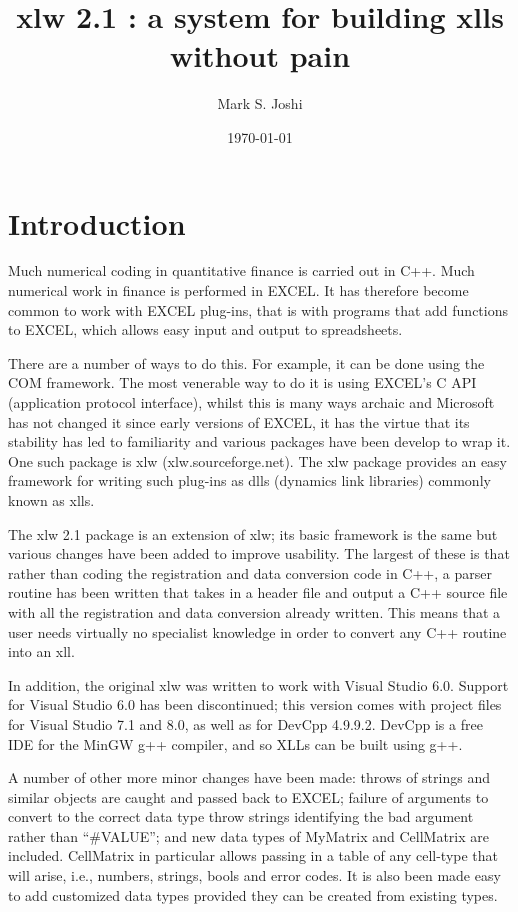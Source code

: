 \documentclass[12pt,reqno]{amsart}
\title[xlw 2,1]{
xlw 2.1 : a system for building xlls without pain
}
\author{Mark S. Joshi}
\date {\today}
\numberwithin{equation}{section}
\numberwithin{figure}{section}
\begin{document}
\maketitle
\section{Introduction}
Much numerical coding in quantitative finance is carried out in
C++. Much numerical work in finance is performed in EXCEL. It has
therefore become common to work with EXCEL plug-ins, that is with
programs that add functions to EXCEL, which allows easy input and output
to spreadsheets.

There are a number of ways to do this. For example, it can be done
using the COM framework. The most venerable way to do it is using
EXCEL's C API (application protocol interface), whilst this is many
ways archaic and Microsoft has not changed it since early versions of
EXCEL, it has the virtue that its stability has led to familiarity and
various packages have been develop to wrap it. One such package is xlw
(xlw.sourceforge.net). The xlw package provides an easy framework for
writing such plug-ins as dlls (dynamics link libraries) commonly known
as xlls. 

The xlw 2.1 package is an extension of xlw; its basic framework is the same but
various changes have been added to improve usability. The largest of these is
that rather than coding the registration and data conversion code in C++, a
parser routine has been written that takes in a header file and output a C++
source file with all the registration and data conversion already written. This
means that a user needs virtually no specialist knowledge in order to convert
any C++ routine into an xll.  

In addition, the original xlw was written to work with Visual Studio 6.0.
Support for Visual Studio 6.0 has been discontinued; this version comes with
project files for Visual Studio 7.1 and 8.0, as well as for DevCpp 4.9.9.2.
DevCpp is a free IDE for the MinGW g++ compiler, and so XLLs can be built using
g++. 

A number of other more minor changes have been made: throws of strings and
similar objects are caught and passed back to EXCEL; failure of
arguments to convert to the correct data type throw strings
identifying the bad argument rather than ``\#VALUE''; and new data
types of MyMatrix and CellMatrix are included. CellMatrix in
particular allows passing in a table of any cell-type that will arise,
i.e., numbers, strings, bools and error codes. It is also been made
easy to add customized data types provided they can be created from
existing types. 
\end{document}
